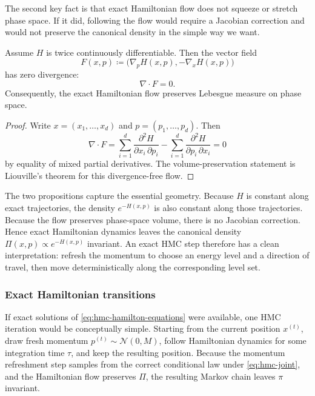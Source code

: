 The second key fact is that exact Hamiltonian flow does not squeeze or stretch phase space.
If it did, following the flow would require a Jacobian correction and would not preserve the canonical density in the simple way we want.

\begin{proposition}
\label{prop:hmc-volume-preservation}
Assume $H$ is twice continuously differentiable.
Then the vector field
\[
  F(x,p) \coloneqq \bigl(\nabla_p H(x,p),-\nabla_x H(x,p)\bigr)
\]
has zero divergence:
\[
  \nabla\cdot F = 0.
\]
Consequently, the exact Hamiltonian flow preserves Lebesgue measure on phase space.
\end{proposition}
\begin{proof}
Write $x=(x_1,\dots,x_d)$ and $p=(p_1,\dots,p_d)$.
Then
\[
  \nabla\cdot F
  =
  \sum_{i=1}^d
  \frac{\partial^2 H}{\partial x_i\,\partial p_i}
  -
  \sum_{i=1}^d
  \frac{\partial^2 H}{\partial p_i\,\partial x_i}
  = 0
\]
by equality of mixed partial derivatives.
The volume-preservation statement is Liouville's theorem for this divergence-free flow.%
\end{proof}

The two propositions capture the essential geometry.
Because $H$ is constant along exact trajectories, the density $e^{-H(x,p)}$ is also constant along those trajectories.
Because the flow preserves phase-space volume, there is no Jacobian correction.
Hence exact Hamiltonian dynamics leaves the canonical density $\Pi(x,p)\propto e^{-H(x,p)}$ invariant.
An exact HMC step therefore has a clean interpretation: refresh the momentum to choose an energy level and a direction of travel, then move deterministically along the corresponding level set.

\subsubsection{Exact Hamiltonian transitions}
\label{subsubsec:hmc-ideal-transition}

If exact solutions of \eqref{eq:hmc-hamilton-equations} were available, one HMC iteration would be conceptually simple.
Starting from the current position $x^{(t)}$, draw fresh momentum $p^{(t)}\sim \mathcal{N}(0,M)$, follow Hamiltonian dynamics for some integration time $\tau$, and keep the resulting position.
Because the momentum refreshment step samples from the correct conditional law under \eqref{eq:hmc-joint}, and the Hamiltonian flow preserves $\Pi$, the resulting Markov chain leaves $\pi$ invariant.

